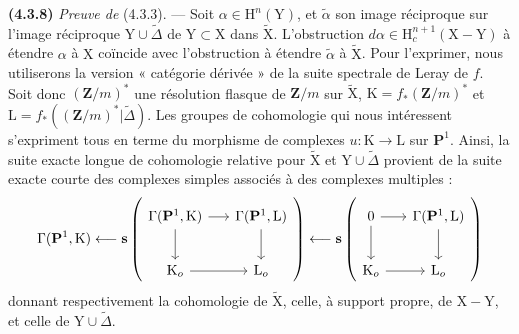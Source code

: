 \documentclass[11pt,leqno]{article}
\begin{document}
\textbf{(4.3.8)} \textit{Preuve de} (4.3.3). — Soit \(\alpha\in\mathrm{H}^n(\mathrm{Y})\), et \(\widetilde{\alpha}\) son image réciproque sur l’image réciproque \(\mathrm{Y}\cup\widetilde{\Delta}\) de \(\mathrm{Y}\subset\mathrm{X}\) dans \(\widetilde{\mathrm{X}}\). L’obstruction \(d\alpha\in\mathrm{H}_c^{n+1}(\mathrm{X}-\mathrm{Y})\) à étendre \(\alpha\) à \(\mathrm{X}\) coïncide avec l’obstruction à étendre \(\widetilde{\alpha}\) à \(\widetilde{\mathrm{X}}\). Pour l’exprimer, nous utiliserons la version « catégorie dérivée » de la suite spectrale de Leray de \(f\). Soit donc \((\mathbf{Z}/m)^*\) une résolution flasque de \(\mathbf{Z}/m\) sur \(\widetilde{\mathrm{X}}\), \(\mathrm{K}=f_*(\mathbf{Z}/m)^*\) et \(\mathrm{L}=f_*((\mathbf{Z}/m)^*|\widetilde{\Delta})\). Les groupes de cohomologie qui nous intéressent s’expriment tous en terme du morphisme de complexes \(u:\mathrm{K}\to\mathrm{L}\) sur \(\mathbf{P}^1\). Ainsi, la suite exacte longue de cohomologie relative pour \(\widetilde{\mathrm{X}}\) et \(\mathrm{Y}\cup\widetilde{\Delta}\) provient de la suite exacte courte des complexes simples associés à des complexes multiples :
\[
\Gamma(\mathbf{P}^1,\mathrm{K})
\longleftarrow
\mathbf{s}\left(
\begin{tikzcd}[ampersand replacement=\&, column sep=1.5em, row sep=2.2em]
\Gamma(\mathbf{P}^1,\mathrm{K}) \arrow[r] \arrow[d]
  \& \Gamma(\mathbf{P}^1,\mathrm{L}) \arrow[d] \\
\mathrm{K}_o \arrow[r] \& \mathrm{L}_o
\end{tikzcd}
\right)
\longleftarrow
\mathbf{s}\left(
\begin{tikzcd}[ampersand replacement=\&, column sep=1.5em, row sep=2.2em]
0 \arrow[r] \arrow[d]
  \& \Gamma(\mathbf{P}^1,\mathrm{L}) \arrow[d] \\
\mathrm{K}_o \arrow[r] \& \mathrm{L}_o
\end{tikzcd}
\right)
\]
donnant respectivement la cohomologie de \(\widetilde{\mathrm{X}}\), celle, à support propre, de \(\mathrm{X}-\mathrm{Y}\), et celle de \(\mathrm{Y}\cup\widetilde{\Delta}\).
\end{document}
